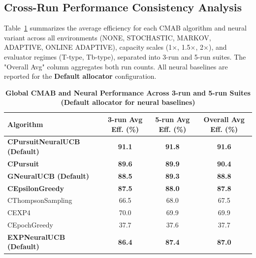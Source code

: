 \documentclass[12pt,a4paper]{article}
\newcommand{\performance}[1]{\textcolor{performancecolor}{\textbf{#1}}}
\newcommand{\legacy}[1]{\textcolor{legacycolor}{\textbf{#1}}}
\newcommand{\neural}[1]{\textcolor{neuralcolor}{\textbf{#1}}}
\begin{document}
\begin{tcolorbox}[colback=performancecolor!10,colframe=performancecolor,title=\textbf{Primary Performance Results (Aggregated Across Capacities, Environments, and Regimes)}]

\subsection{Cross-Run Performance Consistency Analysis}

Table~\ref{tab:global-performance} summarizes the average efficiency for each CMAB algorithm and neural variant across all environments (NONE, STOCHASTIC, MARKOV, ADAPTIVE, ONLINE ADAPTIVE), capacity scales (1$\times$, 1.5$\times$, 2$\times$), and evaluator regimes (T-type, Tb-type), separated into 3-run and 5-run suites. The "Overall Avg" column aggregates both run counts. All neural baselines are reported for the \textbf{Default allocator} configuration.

\begin{table}[H]
\small
\centering
\caption{\performance{Global CMAB and Neural Performance Across 3-run and 5-run Suites (Default allocator for neural baselines)}}
\label{tab:global-performance}
\begin{tabular}{|l|c|c|c|}
\hline
\textbf{Algorithm} & \textbf{3-run Avg Eff. (\%)} & \textbf{5-run Avg Eff. (\%)} & \textbf{Overall Avg Eff. (\%)} \\
\hline
\hline
\neural{CPursuitNeuralUCB (Default)}   & \neural{91.1}     & \neural{91.8}     & \neural{\textbf{91.6}} \\
\performance{CPursuit}                 & \performance{89.6} & \performance{89.9} & \performance{\textbf{90.4}} \\
\neural{GNeuralUCB (Default)}         & \neural{88.5}     & \neural{89.3}     & \neural{\textbf{88.8}} \\
\performance{CEpsilonGreedy}          & \performance{87.5} & \performance{88.0} & \performance{\textbf{87.8}} \\
CThompsonSampling                     & 66.5              & 68.0              & 67.5 \\
CEXP4                                 & 70.0              & 69.9              & 69.9 \\
CEpochGreedy                          & 37.7              & 37.6              & 37.7 \\
\legacy{EXPNeuralUCB (Default)}       & \legacy{86.4}     & \legacy{87.4}     & \legacy{87.0} \\
\hline
\end{tabular}
\end{table}


\end{tcolorbox}
\end{document}
